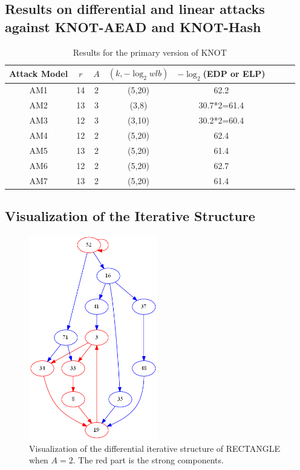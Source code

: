 \subsection{Results on differential and linear attacks against KNOT-AEAD and KNOT-Hash}

\begin{table}
	\caption{Results for the primary version of KNOT}\label{tab:knot}
	\centering
	\begin{tabular}{|c|c|c|c|c|c|c|c|}
		\hline
		Attack Model & $r$ & $A$ & $(k,-\log_2wlb)$ & $-\log_2$(EDP or ELP)\\
		\hline
		AM1 & 14 & 2 & (5,20) & 62.2 \\
		AM2 & 13 & 3 & (3,8) & 30.7*2=61.4 \\
		AM3 & 12 & 3 & (3,10) & 30.2*2=60.4 \\
		AM4 & 12 & 2 & (5,20) & 62.4 \\
		AM5 & 13 & 2 & (5,20) & 61.4 \\
		AM6 & 12 & 2 & (5,20) & 62.7 \\
		AM7 & 13 & 2 & (5,20) & 61.4 \\
		\hline
	\end{tabular}
\end{table}

\subsection{Visualization of the Iterative Structure}

\begin{figure}\label{fig:dis-rect}
    \centering
    \caption{Visualization of the differential iterative structure of RECTANGLE when $A=2$. The red part is the strong components. }
	\includegraphics[width=0.5\textwidth]{fig/test_circuits.png}
\end{figure}

